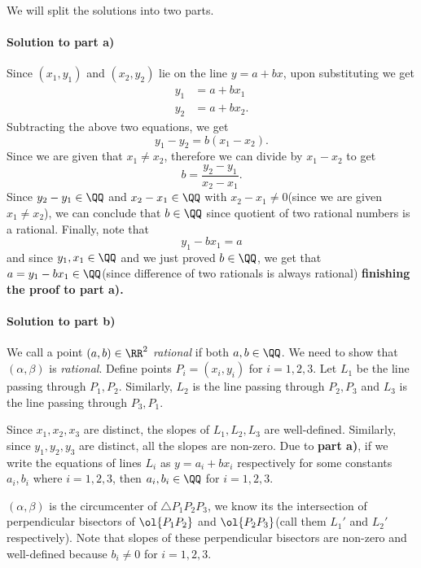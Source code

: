 \documentclass[numbers=endperiod, 11pt]{scrartcl}
\begin{document}
\begin{sol}
    We will split the solutions into two parts.

    \paragraph{Solution to part a)} Since
    $(x_1,y_1)$ and $(x_2,y_2)$ lie on the line
    $y = a + bx$, upon substituting we get
    \begin{align*}
        y_1 & = a + bx_1  \\
        y_2 & = a + bx_2.
    \end{align*}
    Subtracting the above two equations, we get
    \[y_1 - y_2 = b(x_1 - x_2). \]
    Since we are given that $x_1 \ne x_2$, therefore we can
    divide by $x_1 - x_2$ to get
    \[ b = \frac{y_2 - y_1}{x_2 - x_1}. \]
    Since $y_2 - y_1 \in \QQ$ and $x_2 - x_1 \in \QQ$ with
    $x_2 - x_1 \ne 0$(since we are given $x_1 \ne x_2$),
    we can conclude that $b \in \QQ$ since quotient of two
    rational numbers is a rational. Finally, note that
    \[ y_1 - bx_1 = a \]
    and since $y_1, x_1 \in \QQ$ and we just proved
    $b \in \QQ$, we get that
    $a = y_1 - bx_1 \in \QQ$(since difference of two
    rationals is always rational)
    \textbf{finishing the proof to part a). \bsquare}

    \paragraph{Solution to part b)} We call a point
    $(a,b) \in \RR^2$ \emph{rational} if both
    $a,b \in \QQ$. We need to show that $(\alpha,\beta)$
    is \emph{rational}. Define points $P_i = (x_i,y_i)$
    for $i = 1,2,3$. Let $L_1$ be the line passing through
    $P_1, P_2$. Similarly, $L_2$ is the line passing through
    $P_2,P_3$ and $L_3$ is the line passing through
    $P_3, P_1$.

    Since $x_1, x_2, x_3$ are distinct,
    the slopes of $L_1, L_2, L_3$ are well-defined.
    Similarly, since $y_1, y_2, y_3$ are distinct, all
    the slopes are non-zero. Due to \textbf{part a)},
    if we write the equations of lines $L_i$ as
    $y = a_i + bx_i$ respectively for some constants
    $a_i, b_i$ where $i = 1,2,3$, then
    $a_i, b_i \in \QQ$ for $i = 1,2,3$.

    $(\alpha, \beta)$ is the circumcenter of
    $\triangle P_1P_2P_3$, we know its the intersection
    of perpendicular bisectors of $\ol{P_1P_2}$ and
    $\ol{P_2P_3}$(call them $L_1'$ and $L_2'$ respectively).
	Note that slopes of these perpendicular
    bisectors are non-zero and well-defined because
    $b_i \ne 0$ for $i=1,2,3$.


\end{sol}
\end{document}

